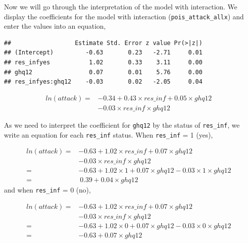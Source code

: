\documentclass[
  10pt,
]{krantz}
\newenvironment{Shaded}{\begin{snugshade}}{\end{snugshade}}
\newcommand{\DecValTok}[1]{\textcolor[rgb]{0.00,0.00,0.81}{#1}}
\newcommand{\FunctionTok}[1]{\textcolor[rgb]{0.00,0.00,0.00}{#1}}
\newcommand{\NormalTok}[1]{#1}
\newcommand{\SpecialCharTok}[1]{\textcolor[rgb]{0.00,0.00,0.00}{#1}}
\begin{document}
Now we will go through the interpretation of the model with interaction. We display the coefficients for the model with interaction (\texttt{pois\_attack\_allx}) and enter the values into an equation,

\begin{Shaded}
\end{Shaded}

\begin{verbatim}
##                  Estimate Std. Error z value Pr(>|z|)
## (Intercept)         -0.63       0.23   -2.71     0.01
## res_infyes           1.02       0.33    3.11     0.00
## ghq12                0.07       0.01    5.76     0.00
## res_infyes:ghq12    -0.03       0.02   -2.05     0.04
\end{verbatim}

\[\begin{aligned}
ln(attack) = & -0.34 + 0.43\times res\_inf + 0.05\times ghq12 \\
             & -0.03\times res\_inf\times ghq12
\end{aligned}\]

As we need to interpret the coefficient for \texttt{ghq12} by the status of \texttt{res\_inf}, we write an equation for each \texttt{res\_inf} status. When \texttt{res\_inf} = 1 (yes),

\[\begin{aligned}
ln(attack) = & -0.63 + 1.02\times res\_inf + 0.07\times ghq12 \\
& -0.03\times res\_inf\times ghq12 \\
= & -0.63 + 1.02\times 1 + 0.07\times ghq12 -0.03\times 1\times ghq12 \\
= &\ 0.39 + 0.04\times ghq12
\end{aligned}\]
and when \texttt{res\_inf} = 0 (no),

\[\begin{aligned}
ln(attack) = & -0.63 + 1.02\times res\_inf + 0.07\times ghq12 \\
& -0.03\times res\_inf\times ghq12 \\
= & -0.63 + 1.02\times 0 + 0.07\times ghq12 -0.03\times 0\times ghq12 \\
= & -0.63 + 0.07\times ghq12
\end{aligned}\]
\end{document}
